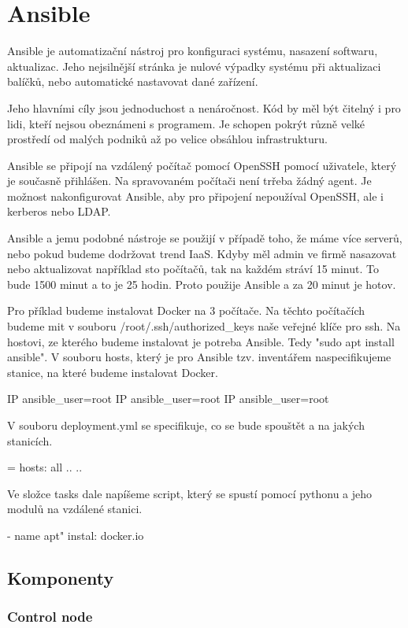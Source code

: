 \section{Ansible}

Ansible je automatizační nástroj pro konfiguraci systému, nasazení softwaru, aktualizac. Jeho nejsilnější stránka je nulové výpadky systému při aktualizaci balíčků, nebo automatické nastavovat dané zařízení. 

Jeho hlavními cíly jsou jednoduchost a nenáročnost. Kód by měl být čitelný i pro lidi, kteří nejsou obeznámeni s programem. Je schopen pokrýt různě velké prostředí od malých podniků až po velice obsáhlou infrastrukturu. 

Ansible se připojí na vzdálený počítač pomocí OpenSSH pomocí uživatele, který je současně přihlášen. Na spravovaném počítači není trřeba žádný agent. Je možnost nakonfigurovat Ansible, aby pro připojení nepoužíval OpenSSH, ale i kerberos nebo LDAP. 

Ansible a jemu podobné nástroje se použijí v případě toho, že máme více serverů, nebo pokud budeme dodržovat trend IaaS. Kdyby měl admin ve firmě nasazovat nebo aktualizovat například sto počítačů, tak na každém stráví 15 minut. To bude 1500 minut a to je 25 hodin. Proto použije Ansible a za 20 minut je hotov. 

Pro příklad budeme instalovat Docker na 3 počítače. Na těchto počítačích budeme mit v souboru /root/.ssh/authorized_keys naše veřejné klíče pro ssh. Na hostovi, ze kterého budeme instalovat je potreba Ansible. Tedy "sudo apt install ansible". V souboru hosts, který je pro Ansible tzv. inventářem naspecifikujeme stanice, na které budeme instalovat Docker. 

IP ansible_user=root
IP ansible_user=root
IP ansible_user=root

V souboru deployment.yml se specifikuje, co se bude spouštět a na jakých stanicích. 

= hosts: all
..
..


Ve složce tasks dale napíšeme script, který se spustí pomocí pythonu a jeho modulů na vzdálené stanici.

- name 
  apt"
  	instal: docker.io
  	
  	
  	

\subsection{Komponenty}

\subsubsection{Control node}

